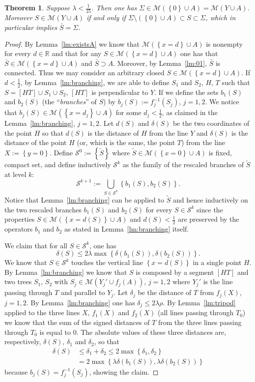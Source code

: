 \documentclass{amsart}
\newcommand{\RR}{\mathbb R}
\newcommand{\ENCLOSE}[1]{\left\{#1\right\}}
\newcommand{\M}{\mathcal{M}}
\renewcommand{\S}{\mathcal{S}}
\newtheorem{theorem}{Theorem}[section]
\theoremstyle{definition}
\theoremstyle{remark}
\begin{document}
\begin{theorem}\label{th:main}
Suppose $\lambda < \frac 1{25}$.
Then one has $\Sigma \in \M(\ENCLOSE{0}\cup A) = \M(Y\cup A)$.
Moreover $S\in \M(Y\cup A)$ if and only if 
$\Sigma\setminus (\ENCLOSE{0}\cup A)\subset S\subset \Sigma$,
which in particular implies $\bar S=\Sigma$.
\end{theorem}
%
\begin{proof}
By Lemma~\ref{lm:existsA} we know that $\M(\ENCLOSE{x=d}\cup A)$
is nonempty for every $d\in \RR$ and
that for any $S\in \M(\ENCLOSE{x=d}\cup A)$ 
one has that $\bar S\in \M(\ENCLOSE{x=d}\cup A)$ and $\bar S\supset A$.
Moreover, by Lemma~\ref{lm:01},
$\bar S$ is connected.
Thus we may consider an arbitrary closed $S\in \M(\ENCLOSE{x=d}\cup A)$.
If $d<\frac 1 2$, 
by Lemma~\ref{lm:branching}, 
we are able to define $S_1$ and $S_2$, $H$, $T$
such that 
$S=[H T] \cup S_1 \cup S_2$, $[HT]$ is perpendicular to $Y$.
If we define the sets $b_1(S)$ and $b_2(S)$ 
(the ``\emph{branches}'' of $S$) 
by $b_j(S) := f_j^{-1}(S_j)$, $j=1,2$.
We notice that $b_j(S)\in \M(\ENCLOSE{x=d_j}\cup A)$ for some $d_j<\frac 1 2$, 
as claimed in the Lemma~\ref{lm:branching}, $j=1,2$.
Let $d(S)$ and $\delta(S)$ be the two coordinates of the point $H$ 
so that $d(S)$ is the distance of $H$ from the line $Y$ 
and $\delta(S)$ is the distance of the point $H$
(or, which is the same, the point $T$) 
from the line $X:=\ENCLOSE{y=0}$.
Define $\S^0:=\ENCLOSE{\tilde S}$ where $\tilde S\in \M(\ENCLOSE{x=0}\cup A)$ 
is fixed, compact set,
and define inductively $\S^k$ as the family of the rescaled branches of $\tilde S$ 
at level $k$:
\[
  \S^{k+1} := \bigcup_{S\in \S^k}\ENCLOSE{b_1(S),b_2(S)}.
\]
Notice that Lemma~\ref{lm:branching} can be applied to $\tilde S$ and 
hence inductively on the two rescaled branches 
$b_1(S)$ and $b_2(S)$ for every $S\in \S^k$
since the properties 
$S \in \M(\ENCLOSE{x=d(S)}\cup A)$ and $d(S)<\frac 1 2$
are preserved by the operators $b_1$ and $b_2$
as stated in Lemma~\ref{lm:branching} itself.

We claim that for all $S\in \S^k$, one has 
\[
  \delta(S)\le 2\lambda \max\ENCLOSE{\delta(b_1(S)),
    \delta(b_2(S))}.
\]
We know that $S\in \S^k$ touches the vertical line $\ENCLOSE{x=d(S)}$ 
in a single point $H$.
By Lemma~\ref{lm:branching} we know that $S$ is composed 
by a segment $[H T]$ and two trees $S_1$, $S_2$
with $S_j\in \M(Y_j'\cup f_j(A))$, $j=1,2$
where $Y_j'$ is the line passing through $T$ and parallel to $Y_j$.
Let $\delta_j$ be the distance of $T$ from $f_j(X)$, $j=1,2$.
By Lemma~\ref{lm:branching} one has $\delta_j \le 2\lambda\rho$.
By Lemma~\ref{lm:tripod} applied to the three lines $X$, $f_1(X)$ and $f_2(X)$
(all lines passing through $T_0$) we know that the sum of the signed distances of $T$ from the three lines 
passing through $T_0$ is equal to $0$.
The absolute values of these three distances
are, respectively, $\delta(S)$, $\delta_1$ and $\delta_2$,
so that
\begin{align*}
  \delta(S) &\le \delta_1 + \delta_2 
    \le 2\max\ENCLOSE{\delta_1,\delta_2}\\
    &= 2\max\ENCLOSE{\lambda\delta(b_1(S)),\lambda\delta(b_2(S))}
  \end{align*}
because $b_j(S)=f_j^{-1}(S_j)$,
showing the claim.


\end{proof}
\end{document}
